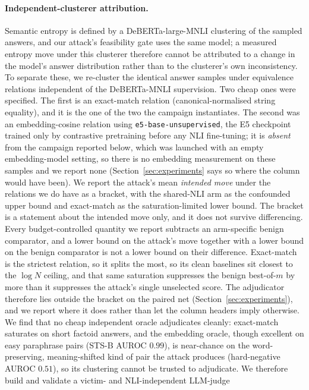 \paragraph{Independent-clusterer attribution.}
Semantic entropy is defined by a DeBERTa-large-MNLI clustering of the sampled answers,
and our attack's feasibility gate uses the same model; a measured entropy move under
this clusterer therefore cannot be attributed to a change in the model's answer
distribution rather than to the clusterer's own inconsistency. To separate these, we
re-cluster the identical answer samples under equivalence relations independent of the
DeBERTa-MNLI supervision. Two cheap ones were specified. The first is an exact-match relation
(canonical-normalised string equality), and it is the one of the two the campaign
instantiates. The
second was an embedding-cosine relation using \texttt{e5-base-unsupervised}, the E5
checkpoint trained only by contrastive pretraining before any NLI fine-tuning; it is
\emph{absent} from the campaign reported below, which was launched with an empty
embedding-model setting, so there is no embedding measurement on these samples and we
report none (Section~\ref{sec:experiments} says so where the column would have been). We
report the
attack's mean \emph{intended move} under the relations we do have as a bracket, with the
shared-NLI arm as the
confounded upper bound and exact-match as the saturation-limited lower bound. The bracket is
a statement about the intended move only, and it does not survive differencing. Every
budget-controlled quantity we report subtracts an arm-specific benign comparator, and a lower
bound on the attack's move together with a lower bound on the benign comparator is not a
lower bound on their difference. Exact-match is the strictest relation, so it splits the
most, so its clean baselines sit closest to the $\log N$ ceiling, and that same saturation
suppresses the benign best-of-$m$ by more than it suppresses the attack's single unselected
score. The adjudicator therefore lies outside the bracket on the paired net
(Section~\ref{sec:experiments}), and we report where it does rather than let the column
headers imply otherwise. We find that no cheap
independent oracle adjudicates cleanly: exact-match saturates
on short factoid answers, and the embedding oracle, though excellent on easy paraphrase
pairs (STS-B AUROC $0.99$), is near-chance on the word-preserving, meaning-shifted kind of
pair the attack produces (hard-negative AUROC $0.51$), so its clustering cannot be trusted to
adjudicate. We therefore build and validate a victim- and NLI-independent LLM-judge
